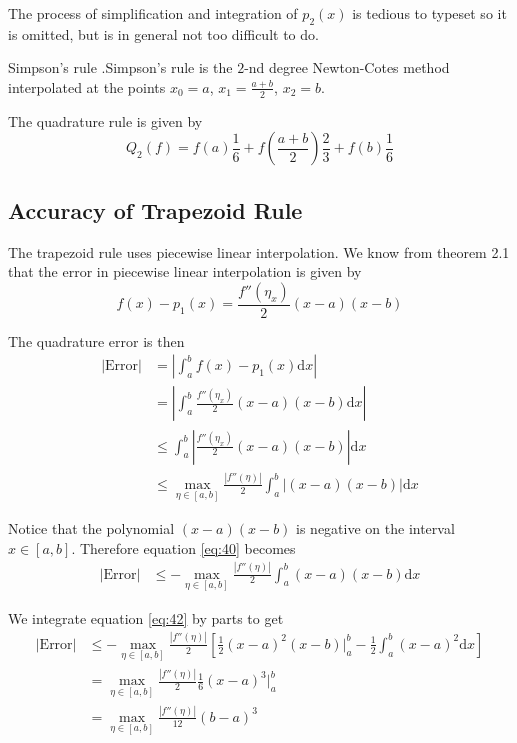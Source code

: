\documentclass[12pt,letterpaper]{article}
\newcommand{\dd}{\mathrm{d}}
\begin{document}
The process of simplification and integration of $p_2(x)$ is tedious to typeset so it is omitted, but is in general not too difficult to do.

\begin{defn}{Simpson's rule}
.Simpson's rule is the $2$-nd degree Newton-Cotes method interpolated at the points $x_0=a$, $x_1=\frac{a+b}{2}$, $x_2=b$.

\medskip

The quadrature rule is given by
\begin{equation}
	Q_2(f) = f(a) \frac{1}{6} + f\left(\frac{a+b}{2}\right) \frac{2}{3} + f(b) \frac{1}{6}
\end{equation}
\label{defn:simpson_rule}
\end{defn}

\subsection{Accuracy of Trapezoid Rule}

The trapezoid rule uses piecewise linear interpolation. We know from theorem 2.1 that the error in piecewise linear interpolation is given by
\begin{equation}
	f(x) - p_1(x) = \frac{f''(\eta_x)}{2} (x-a)(x-b)
\end{equation}

The quadrature error is then
\begin{align}
	\big| \text{Error} \big| &= \left| \int_a^b f(x) - p_1(x) \dd x \right| \\
	&= \left| \int_a^b \frac{f''(\eta_x)}{2}(x-a)(x-b) \dd x \right| \\
	&\leq \int_a^b \left| \frac{f''(\eta_x)}{2} (x-a)(x-b) \right| \dd x \\
	&\leq \max_{\eta \in [a, b]} \frac{\left| f''(\eta) \right|}{2} \int_a^b \left| (x-a)(x-b) \right| \dd x \label{eq:40}
\end{align}

Notice that the polynomial $(x-a)(x-b)$ is negative on the interval $x \in [a,b]$. Therefore equation \ref{eq:40} becomes
\begin{align}
	\big| \text{Error} \big| &\leq -\max_{\eta\in[a,b]}\frac{\left| f''(\eta) \right|}{2} \int_a^b (x-a)(x-b) \dd x \label{eq:42}
\end{align}

We integrate equation \ref{eq:42} by parts to get
\begin{align}
	\big| \text{Error} \big| &\leq -\max_{\eta\in[a,b]}\frac{\left| f''(\eta) \right|}{2}\left[\frac{1}{2}(x-a)^2(x-b) \bigg|_a^b - \frac{1}{2} \int_a^b (x-a)^2 \dd x \right] \\
	&= \max_{\eta\in[a,b]}\frac{\left| f''(\eta) \right|}{2} \frac{1}{6} (x-a)^3 \bigg|_a^b \\
	&= \max_{\eta\in[a,b]}\frac{\left| f''(\eta) \right|}{12} (b-a)^3
\end{align}
\end{document}
